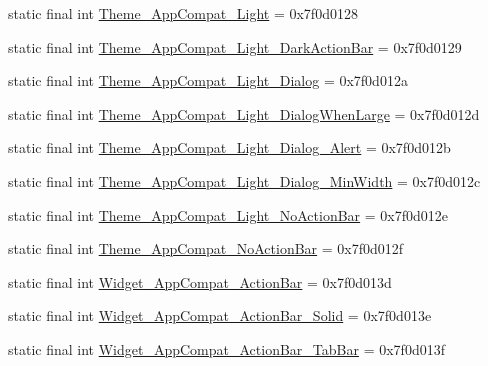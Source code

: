 \begin{DoxyCompactItemize}
\item 
static final int \mbox{\hyperlink{classandroid_1_1support_1_1v7_1_1appcompat_1_1R_1_1style_a23c0b66055cf7effa3936aacc729427f}{Theme\+\_\+\+App\+Compat\+\_\+\+Light}} = 0x7f0d0128
\item 
static final int \mbox{\hyperlink{classandroid_1_1support_1_1v7_1_1appcompat_1_1R_1_1style_a6de852fddd40a4c6612af07b17de8796}{Theme\+\_\+\+App\+Compat\+\_\+\+Light\+\_\+\+Dark\+Action\+Bar}} = 0x7f0d0129
\item 
static final int \mbox{\hyperlink{classandroid_1_1support_1_1v7_1_1appcompat_1_1R_1_1style_a1ebb6bd5786d54f735c9379d2b83720f}{Theme\+\_\+\+App\+Compat\+\_\+\+Light\+\_\+\+Dialog}} = 0x7f0d012a
\item 
static final int \mbox{\hyperlink{classandroid_1_1support_1_1v7_1_1appcompat_1_1R_1_1style_ac8cb621e0bc006a8e787cc01fa5a019b}{Theme\+\_\+\+App\+Compat\+\_\+\+Light\+\_\+\+Dialog\+When\+Large}} = 0x7f0d012d
\item 
static final int \mbox{\hyperlink{classandroid_1_1support_1_1v7_1_1appcompat_1_1R_1_1style_a3154c269ba4155524296e31f2fb85495}{Theme\+\_\+\+App\+Compat\+\_\+\+Light\+\_\+\+Dialog\+\_\+\+Alert}} = 0x7f0d012b
\item 
static final int \mbox{\hyperlink{classandroid_1_1support_1_1v7_1_1appcompat_1_1R_1_1style_a31c9ec44a65783612f967848055d20e9}{Theme\+\_\+\+App\+Compat\+\_\+\+Light\+\_\+\+Dialog\+\_\+\+Min\+Width}} = 0x7f0d012c
\item 
static final int \mbox{\hyperlink{classandroid_1_1support_1_1v7_1_1appcompat_1_1R_1_1style_ab207bbb6037b2de95c4385c5bb64c186}{Theme\+\_\+\+App\+Compat\+\_\+\+Light\+\_\+\+No\+Action\+Bar}} = 0x7f0d012e
\item 
static final int \mbox{\hyperlink{classandroid_1_1support_1_1v7_1_1appcompat_1_1R_1_1style_a8519c957330167d04ac87177caf9ae06}{Theme\+\_\+\+App\+Compat\+\_\+\+No\+Action\+Bar}} = 0x7f0d012f
\item 
static final int \mbox{\hyperlink{classandroid_1_1support_1_1v7_1_1appcompat_1_1R_1_1style_af9ccaa30f85b041b6f0c7f5077795979}{Widget\+\_\+\+App\+Compat\+\_\+\+Action\+Bar}} = 0x7f0d013d
\item 
static final int \mbox{\hyperlink{classandroid_1_1support_1_1v7_1_1appcompat_1_1R_1_1style_a05dee95ca4a31058f1e8749708f4e244}{Widget\+\_\+\+App\+Compat\+\_\+\+Action\+Bar\+\_\+\+Solid}} = 0x7f0d013e
\item 
static final int \mbox{\hyperlink{classandroid_1_1support_1_1v7_1_1appcompat_1_1R_1_1style_a631483194eb7110b33fa5158287a2e5d}{Widget\+\_\+\+App\+Compat\+\_\+\+Action\+Bar\+\_\+\+Tab\+Bar}} = 0x7f0d013f

\end{DoxyCompactItemize}
